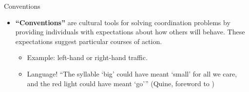 \documentclass[10pt]{beamer}
\begin{document}
\begin{frame}{Conventions}
\begin{itemize}
        
        \item<4-> \textbf{``Conventions''} are cultural tools for solving coordination problems by providing individuals with expectations about how others will behave. These expectations suggest particular courses of action.
        \begin{itemize}
            \item<5-> Example: left-hand or right-hand traffic.
            \item<6-> Language! ``The syllable `big' could have meant `small' for all we care, and the red light could have meant `go''' (Quine, foreword to \citealt{Lewis2002})
        \end{itemize}
    \end{itemize}
\end{frame}
\end{document}
